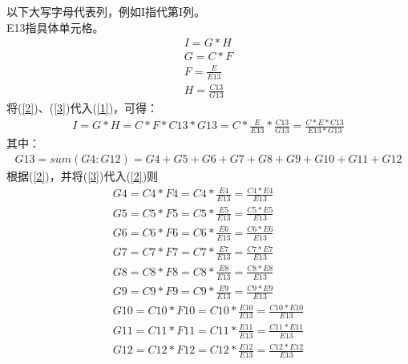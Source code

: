 



%

%

%

\usepackage{textcomp}
\usepackage{amsmath}



以下大写字母代表列，例如I指代第I列。\\
E13指具体单元格。\\
\begin{gather}
    \label{1}
    I=G*H \\
    \label{2}
    G=C*F\\
    \label{3}
    F=\frac{E}{E13}\\
    \label{4}
    H=\frac{C13}{G13}
\end{gather}
将(\ref{2})、(\ref{3})代入(\ref{1})，可得：\\
\begin{gather}
    \label{5}
    I=G*H=C*F*C13*G13=C*\frac{E}{E13}*\frac{C13}{G13}=\frac{C*E*C13}{E13*G13}
\end{gather}
其中：
\begin{gather}
    \label{6}
    G13=sum(G4:G12)=G4+G5+G6+G7+G8+G9+G10+G11+G12
\end{gather}
根据(\ref{2})，并将(\ref{3})代入(\ref{2})则
\begin{gather}
    \label{7}
    G4=C4*F4=C4*\frac{E4}{E13}=\frac{C4*E4}{E13}\\
    G5=C5*F5=C5*\frac{E5}{E13}=\frac{C5*E5}{E13}\\
    G6=C6*F6=C6*\frac{E6}{E13}=\frac{C6*E6}{E13}\\
    G7=C7*F7=C7*\frac{E7}{E13}=\frac{C7*E7}{E13}\\
    G8=C8*F8=C8*\frac{E8}{E13}=\frac{C8*E8}{E13}\\
    G9=C9*F9=C9*\frac{E9}{E13}=\frac{C9*E9}{E13}\\
    G10=C10*F10=C10*\frac{E10}{E13}=\frac{C10*E10}{E13}\\
    G11=C11*F11=C11*\frac{E11}{E13}=\frac{C11*E11}{E13}\\
    \label{15}
    G12=C12*F12=C12*\frac{E12}{E13}=\frac{C12*E12}{E13}
\end{gather}
